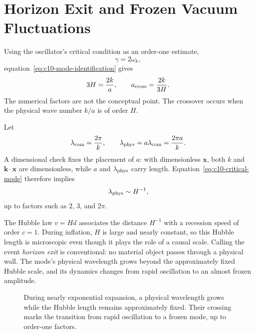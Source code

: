 \section{Horizon Exit and Frozen Vacuum Fluctuations}

Using the oscillator's critical condition as an order-one estimate,
\[
\gamma=2\omega_k,
\]
equation~\eqref{eq:c10-mode-identification} gives
\begin{equation}
3H=\frac{2k}{a},
\qquad
a_{\rm cross}=\frac{2k}{3H}.
\label{eq:c10-critical-mode}
\end{equation}
The numerical factors are not the conceptual point. The crossover occurs when the physical wave number \(k/a\) is of order \(H\).

Let
\[
\lambda_{\rm com}=\frac{2\pi}{k},
\qquad
\lambda_{\rm phys}=a\lambda_{\rm com}
=\frac{2\pi a}{k}.
\]
A dimensional check fixes the placement of \(a\): with dimensionless \(\mathbf x\), both \(k\) and \(\mathbf k\cdot\mathbf x\) are dimensionless, while \(a\) and \(\lambda_{\rm phys}\) carry length. Equation~\eqref{eq:c10-critical-mode} therefore implies
\begin{equation}
\lambda_{\rm phys}\sim H^{-1},
\label{eq:c10-horizon-crossing}
\end{equation}
up to factors such as \(2\), \(3\), and \(2\pi\).

The Hubble law \(v=Hd\) associates the distance \(H^{-1}\) with a recession speed of order \(c=1\). During inflation, \(H\) is large and nearly constant, so this Hubble length is microscopic even though it plays the role of a causal scale. Calling the event \emph{horizon exit} is conventional: no material object passes through a physical wall. The mode's physical wavelength grows beyond the approximately fixed Hubble scale, and its dynamics changes from rapid oscillation to an almost frozen amplitude.

\begin{figure}[htbp]
\centering
\begin{coursefitfigure}
\end{coursefitfigure}
\caption{During nearly exponential expansion, a physical wavelength grows while the Hubble length remains approximately fixed. Their crossing marks the transition from rapid oscillation to a frozen mode, up to order-one factors.}
\label{fig:c10-horizon-reconstruction}
\end{figure}

